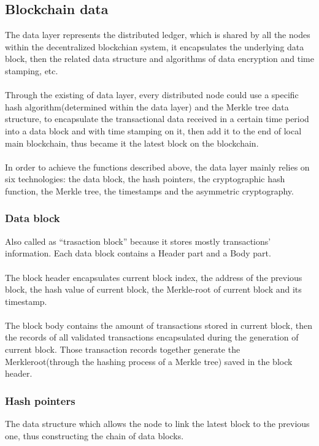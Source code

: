 \documentclass[doublespacing]{bmcart}
\begin{document}
\begin{CJK*}{UTF8}{gbsn}
\subsection{Blockchain data}
The data layer represents the distributed ledger, which is shared by all the nodes within the decentralized blockchian system, it encapsulates the underlying data block, then the related data structure and algorithms of data encryption and time stamping, etc.
\paragraph{} 
Through the existing of data layer, every distributed node could use a specific hash algorithm(determined within the data layer) and the Merkle tree data structure, to encapsulate the transactional data received in a certain time period into a data block and with time stamping on it, then add it to the end of local main blockchain, thus became it the latest block on the blockchain.
\paragraph{} 
In order to achieve the functions described above, the data layer mainly relies on six technologies: the data block, the hash pointers, the cryptographic hash function, the Merkle tree, the timestamps and the asymmetric cryptography.
\subsubsection*{Data block}
Also called as ``trasaction block'' because it stores mostly transactions' information. Each data block contains a Header part and a Body part.
\paragraph{} 
The block header encapsulates current block index, the address of the previous block, the hash value of current block, the Merkle-root of current block and its timestamp.
\paragraph{} 
The block body contains the amount of transactions stored in current block, then the records of all validated transactions encapsulated during the generation of current block. Those transaction records together generate the Merkleroot(through the hashing process of a Merkle tree) saved in the block header. 
\subsubsection*{Hash pointers}
The data structure which allows the node to link the latest block to the previous one, thus constructing the chain of data blocks.

\end{CJK*}
\end{document}
